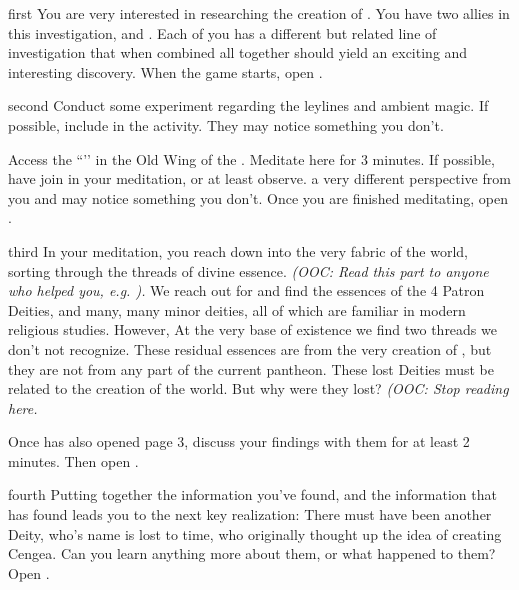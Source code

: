 \documentclass[notebook]{GL2020} %
\begin{document}
\startnotebook{\nCreationThree{}}

\begin{page}{first}
You are very interested in researching the creation of \pEarth{}. You have two allies in this investigation, \cEbbPriest{} and \cHeadScientist{}. Each of you has a different but related line of investigation that when combined all together should yield an exciting and interesting discovery. When the game starts, open .
\end{page}

\begin{page}{second}
Conduct some experiment regarding the leylines and ambient magic. If possible, include \cDisney{} in the activity. They may notice something you don’t.

Access the ``\sLeyLinesNexus{}’’ in the Old Wing of the \pSc{}. Meditate here for 3 minutes. If possible, have \cDisney{} join in your meditation, or at least observe. \cDisney{\They} \cDisney{\have} a very different perspective from you and may notice something you don’t. Once you are finished meditating, open .
\end{page}

\begin{page}{third}
In your meditation, you reach down into the very fabric of the world, sorting through the threads of divine essence. \emph{(OOC: Read this part to anyone who helped you, e.g. \cDisney{}).} We reach out for and find the essences of the 4 Patron Deities, and many, many minor deities, all of which are familiar in modern religious studies. However, At the very base of existence we find two threads we don't not recognize. These residual essences are from the very creation of \pEarth{}, but they are not from any part of the current pantheon. These lost Deities must be related to the creation of the world. But why were they lost? \emph{(OOC: Stop reading here.}

Once \textbf{\cHeadScientist {}} has also opened page 3, discuss your findings with them for at least 2 minutes. Then open .
\end{page}

\begin{page}{fourth}
Putting together the information you’ve found, and the information that \cHeadScientist{} has found leads you to the next key realization: There must have been another Deity, who’s name is lost to time, who originally thought up the idea of creating Cengea. Can you learn anything more about them, or what happened to them? Open .
\end{page}
\end{document}
